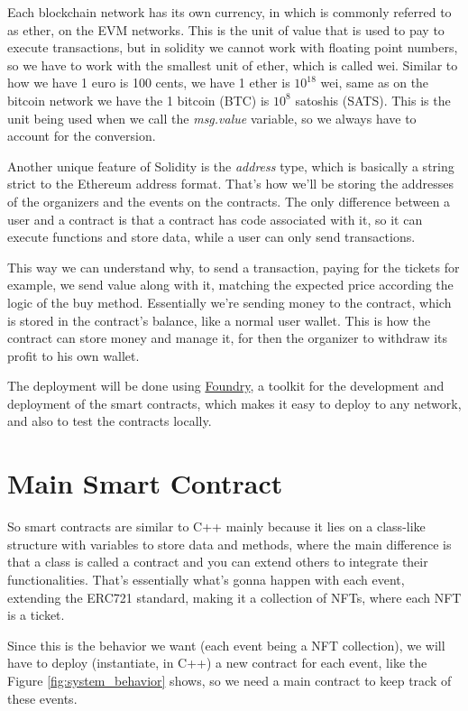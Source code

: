 Each blockchain network has its own currency, in which is commonly referred to
as ether, on the EVM networks. This is the unit of value that is used to pay to
execute transactions, but in solidity we cannot work with floating point
numbers, so we have to work with the smallest unit of ether, which is called
wei. Similar to how we have 1 euro is 100 cents, we have 1 ether is $10^{18}$
wei, same as on the bitcoin network we have the 1 bitcoin (BTC) is $10^{8}$
satoshis (SATS). This is the unit being used when we call the
\textit{msg.value} variable, so we always have to account for the conversion.

Another unique feature of Solidity is the \textit{address} type, which is
basically a string strict to the Ethereum address format. That's how we'll be
storing the addresses of the organizers and the events on the contracts. The
only difference between a user and a contract is that a contract has code
associated with it, so it can execute functions and store data, while a user
can only send transactions.

This way we can understand why, to send a transaction, paying for the tickets
for example, we send value along with it, matching the expected price according
the logic of the buy method. Essentially we're sending money to the contract,
which is stored in the contract's balance, like a normal user wallet. This is
how the contract can store money and manage it, for then the organizer to
withdraw its profit to his own wallet.

The deployment will be done using \href{https://book.getfoundry.sh/}{Foundry},
a toolkit for the development and deployment of the smart contracts, which
makes it easy to deploy to any network, and also to test the contracts locally.

\section{Main Smart Contract}
\label{sec:main_smart_contract}

So smart contracts are similar to C++ mainly because it lies on a class-like
structure with variables to store data and methods, where the main difference
is that a class is called a contract and you can extend others to integrate
their functionalities. That's essentially what's gonna happen with each event,
extending the ERC721 standard, making it a collection of NFTs, where each NFT
is a ticket.

Since this is the behavior we want (each event being a NFT collection), we will
have to deploy (instantiate, in C++) a new contract for each event, like the
Figure \ref{fig:system_behavior} shows, so we need a main contract to keep
track of these events.

